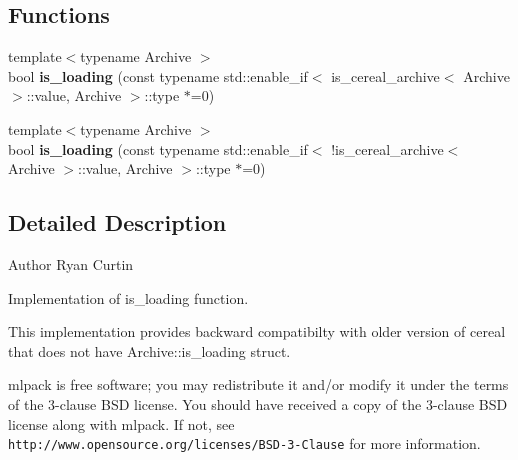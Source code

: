 \subsection*{Functions}
\begin{DoxyCompactItemize}
\item 
{\footnotesize template$<$typename Archive $>$ }\\bool \textbf{ is\+\_\+loading} (const typename std\+::enable\+\_\+if$<$ is\+\_\+cereal\+\_\+archive$<$ Archive $>$\+::value, Archive $>$\+::type $\ast$=0)
\item 
{\footnotesize template$<$typename Archive $>$ }\\bool \textbf{ is\+\_\+loading} (const typename std\+::enable\+\_\+if$<$ !is\+\_\+cereal\+\_\+archive$<$ Archive $>$\+::value, Archive $>$\+::type $\ast$=0)
\end{DoxyCompactItemize}


\subsection{Detailed Description}
\begin{DoxyAuthor}{Author}
Ryan Curtin
\end{DoxyAuthor}
Implementation of is\+\_\+loading function.

This implementation provides backward compatibilty with older version of cereal that does not have Archive\+::is\+\_\+loading struct.

mlpack is free software; you may redistribute it and/or modify it under the terms of the 3-\/clause B\+SD license. You should have received a copy of the 3-\/clause B\+SD license along with mlpack. If not, see {\tt http\+://www.\+opensource.\+org/licenses/\+B\+S\+D-\/3-\/\+Clause} for more information. 